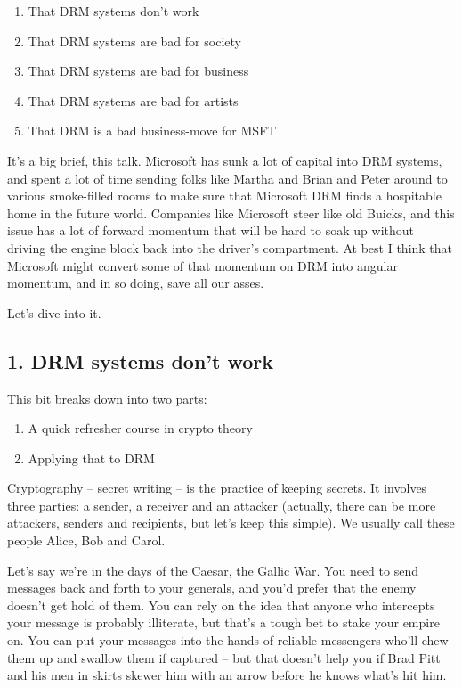 \begin{enumerate}
\item
  That DRM systems don't work
\item
  That DRM systems are bad for society
\item
  That DRM systems are bad for business
\item
  That DRM systems are bad for artists
\item
  That DRM is a bad business-move for MSFT
\end{enumerate}
It's a big brief, this talk. Microsoft has sunk a lot of capital
into DRM systems, and spent a lot of time sending folks like Martha
and Brian and Peter around to various smoke-filled rooms to make
sure that Microsoft DRM finds a hospitable home in the future
world. Companies like Microsoft steer like old Buicks, and this
issue has a lot of forward momentum that will be hard to soak up
without driving the engine block back into the driver's
compartment. At best I think that Microsoft might convert some of
that momentum on DRM into angular momentum, and in so doing, save
all our asses.

Let's dive into it.

\subsection{1. DRM systems don't work}

This bit breaks down into two parts:

\begin{enumerate}
\item
  A quick refresher course in crypto theory
\item
  Applying that to DRM
\end{enumerate}
Cryptography -- secret writing -- is the practice of keeping
secrets. It involves three parties: a sender, a receiver and an
attacker (actually, there can be more attackers, senders and
recipients, but let's keep this simple). We usually call these
people Alice, Bob and Carol.

Let's say we're in the days of the Caesar, the Gallic War. You need
to send messages back and forth to your generals, and you'd prefer
that the enemy doesn't get hold of them. You can rely on the idea
that anyone who intercepts your message is probably illiterate, but
that's a tough bet to stake your empire on. You can put your
messages into the hands of reliable messengers who'll chew them up
and swallow them if captured -- but that doesn't help you if Brad
Pitt and his men in skirts skewer him with an arrow before he knows
what's hit him.

